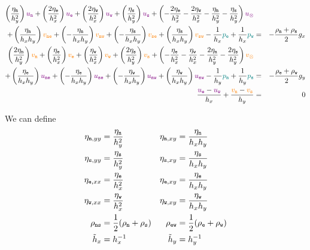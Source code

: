 \begin{eqnarray}
\left( \frac{\eta_{\tt n}}{h_y^2} \right) {\color{violet} u_{\tt n}} + 
\left( \frac{2\eta_{\tt e}}{h_x^2} \right) {\color{violet} u_{\tt e}} + 
\left( \frac{2\eta_{\tt w}}{h_x^2} \right) {\color{violet} u_{\tt w}} + 
\left( \frac{\eta_{\tt s}}{h_y^2} \right) {\color{violet} u_{\tt s}} + 
\left( -\frac{2\eta_{\tt e}}{h_x^2} -\frac{2\eta_{\tt w}}{h_x^2}  
-\frac{\eta_{\tt n}}{h_y^2} -\frac{\eta_{\tt s}}{h_y^2}  
\right) {\color{violet} u_\otimes} \nonumber\\
+
\left( \frac{\eta_{\tt n}}{h_x h_y} \right) {\color{orange} v_{\tt ne}}+ 
\left(-\frac{\eta_{\tt n}}{h_x h_y} \right) {\color{orange} v_{\tt nw}}+ 
\left(-\frac{\eta_{\tt s}}{h_x h_y} \right) {\color{orange} v_{\tt se}}+ 
\left( \frac{\eta_{\tt s}}{h_x h_y} \right) {\color{orange} v_{\tt sw}} 
- \frac{1}{h_x} {\color{teal}p_{\tt e}} + \frac{1}{h_x} {\color{teal}p_{\tt w}} 
&=& -\frac{\rho_{\tt n}+\rho_{\tt s}}{2} g_x 
\nonumber\\
\left( \frac{2\eta_{\tt n}}{h_y^2} \right) {\color{orange} v_{\tt n}} +
\left( \frac{ \eta_{\tt e}}{h_x^2} \right) {\color{orange} v_{\tt e}} +
\left( \frac{ \eta_{\tt w}}{h_x^2} \right) {\color{orange} v_{\tt w}} +
\left( \frac{2\eta_{\tt s}}{h_y^2} \right) {\color{orange} v_{\tt s}} +
\left( 
-\frac{\eta_{\tt e}}{h_x^2} 
-\frac{\eta_{\tt w}}{h_x^2} 
-\frac{2\eta_{\tt n}}{h_y^2} 
-\frac{2\eta_{\tt s}}{h_y^2} 
\right) {\color{orange} v_\otimes} \nonumber\\
+
\left( \frac{\eta_{\tt e}}{h_x h_y} \right) {\color{violet} u_{\tt ne}} +
\left(-\frac{\eta_{\tt e}}{h_x h_y} \right) {\color{violet} u_{\tt se}} +
\left(-\frac{\eta_{\tt w}}{h_x h_y} \right) {\color{violet} u_{\tt nw}} +
\left( \frac{\eta_{\tt w}}{h_x h_y} \right) {\color{violet} u_{\tt sw}} 
-\frac{1}{h_y} {\color{teal}p_{\tt n}} + \frac{1}{h_y} {\color{teal}p_{\tt s}}
&=& -\frac{\rho_{\tt e}+\rho_{\tt w}}{2} g_y \nonumber\\
\frac{{\color{violet}u_{\tt e}}-{\color{violet}u_{\tt w}}}{h_x} 
+
\frac{{\color{orange}v_{\tt n}}-{\color{orange}v_{\tt s}}}{h_y} 
&=&0 \nonumber
\end{eqnarray}



We can define
\begin{align}
\eta_{{\tt n},yy} &= \frac{\eta_{\tt n}}{h_y^2}  &
\eta_{{\tt n},xy} &= \frac{\eta_{\tt n}}{h_xh_y}  \nonumber\\
\eta_{{\tt s},yy} &= \frac{\eta_{\tt s}}{h_y^2}  &
\eta_{{\tt s},xy} &= \frac{\eta_{\tt s}}{h_xh_y}  \nonumber\\
\eta_{{\tt e},xx} &= \frac{\eta_{\tt e}}{h_x^2}  &
\eta_{{\tt e},xy} &= \frac{\eta_{\tt e}}{h_xh_y}  \nonumber\\
\eta_{{\tt w},xx} &= \frac{\eta_{\tt w}}{h_x^2}  &
\eta_{{\tt w},xy} &= \frac{\eta_{\tt w}}{h_xh_y}  \nonumber\\
\rho_{{\tt ns}}   &= \frac12 (\rho_{\tt n}+\rho_{\tt s}) &
\rho_{{\tt ew}}   &= \frac12 (\rho_{\tt e}+\rho_{\tt w}) \nonumber\\
\tilde{h}_x &=h_x^{-1} &
\tilde{h}_y &=h_y^{-1} \nonumber
\end{align}

